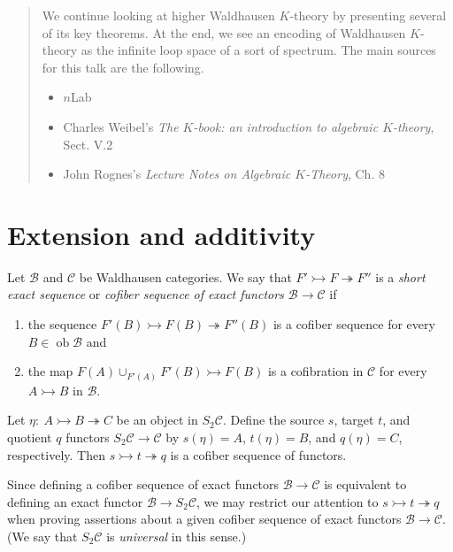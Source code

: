 \documentclass[10pt,letterpaper,cm]{nupset}
\theoremstyle{definition}
\theoremstyle{theorem}
\theoremstyle{remark}
\newcommand{\1}{\mathbf{1}}
\renewcommand{\b}{\mathscr{B}}
\renewcommand{\c}{\mathscr{C}}
\newcommand{\0}{\vec 0}
\DeclareMathOperator{\ob}{ob}
\begin{document}
\begin{abstract}
We continue looking at higher Waldhausen $K$-theory by presenting several of its key theorems. At the end, we see an encoding of Waldhausen $K$-theory as the infinite loop space of a sort of spectrum. The main sources for this talk are the following.
\begin{itemize}
\item $n$Lab
\item Charles Weibel's \textit{The $K$-book: an introduction to algebraic $K$-theory},  Sect. V.2
\item John Rognes's \textit{Lecture Notes on Algebraic $K$-Theory}, Ch. 8
\end{itemize}
\end{abstract}

\smallskip

\section{Extension and additivity}

Let $\b$ and $\c$ be Waldhausen categories. We say that $F' \rightarrowtail F \twoheadrightarrow F''$ is a \textit{short exact sequence} or \textit{cofiber sequence of exact functors $\b \to \c$} if 
\begin{enumerate}[label=(\roman*)]
\item the sequence  $F'(B) \rightarrowtail F(B) \twoheadrightarrow F''(B)$ is a cofiber sequence for every $B\in \ob{\b}$ and 
\item the map $F(A) \cup_{F'(A)} F'(B) \rightarrowtail F(B)$ is a cofibration in $\c$ for every $A \rightarrowtail B$ in $\b$.
\end{enumerate}


Let $\eta :\ A \rightarrowtail B \twoheadrightarrow C$ be an object in $S_2{\c}$. Define the source $s$, target $t$, and quotient $q$ functors $S_2{\c} \to \c$ by $s(\eta) = A$, $t(\eta) = B$, and $q(\eta) = C$, respectively. Then $s \rightarrowtail t \twoheadrightarrow q$ is a cofiber sequence of functors. 

Since defining a cofiber sequence of exact functors $\b \to \c$ is equivalent to defining an exact functor $\b \to S_2{\c}$, we may restrict our attention to $s \rightarrowtail t \twoheadrightarrow q$ when proving assertions about a given cofiber sequence of exact functors $\b \to \c$. (We say that $S_2{\c}$ is \textit{universal} in this sense.)
\end{document}
